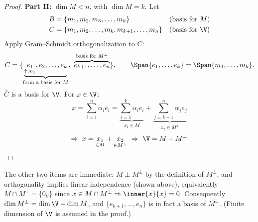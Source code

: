 \begin{proof}
\textbf{Part II:} $\dim M<n$, with $\dim M = k$. Let
\begin{align*}
B&=\{m_1,m_2,m_3,\dots,m_k\} && \text{(basis for } M)\\
C&=\{m_1,m_2,\dots,m_k,m_{k+1},\dots,m_n\} && \text{(basis for } \V)
\end{align*}
Apply Gram--Schmidt orthogonalization to $C$:
\[
\bar C=\{\underbrace{\underset{\uparrow\, m_1}{e_1},e_2,\dots,e_k}_{\text{form a basis for } M},\ \overbrace{e_{k+1},\dots,e_n}^{\text{basis for } M^\perp}\},
\qquad
\Span\{e_1,\dots,e_k\}=\Span\{m_1,\dots,m_k\}.
\]
$\bar C$ is a basis for $\V$. For $x\in\V$:
\[
x=\sum_{i=1}^{n}\alpha_ie_i=\underbrace{\sum_{i=1}^{k}\alpha_ie_i}_{x_1\in M}+\underbrace{\sum_{j=k+1}^{n}\alpha_je_j}_{x_2\in M^\perp}
\]
\[
\Rightarrow\ x=\underset{\in M}{x_1}+\underset{\in M^\perp}{x_2}\ \Rightarrow\ \V=M+M^\perp \qedhere
\]
\end{proof}
\begin{insight}
The other two items are immediate: $M\perp M^\perp$ by the definition of $M^\perp$, and orthogonality implies linear independence (shown above), equivalently $M\cap M^\perp=\{0_V\}$ since $x\in M\cap M^\perp\Rightarrow\inner{x}{x}=0$. Consequently $\dim M^\perp=\dim\V-\dim M$, and $\{e_{k+1},\dots,e_n\}$ is in fact a basis of $M^\perp$. (Finite dimension of $\V$ is assumed in the proof.)
\end{insight}

